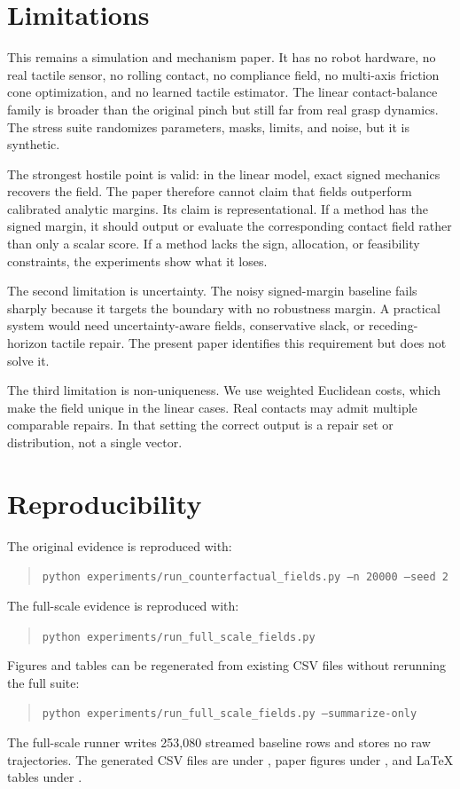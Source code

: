 \documentclass{article}
\begin{document}
\section{Limitations}

This remains a simulation and mechanism paper. It has no robot hardware, no real tactile sensor, no rolling contact, no compliance field, no multi-axis friction cone optimization, and no learned tactile estimator. The linear contact-balance family is broader than the original pinch but still far from real grasp dynamics. The stress suite randomizes parameters, masks, limits, and noise, but it is synthetic.

The strongest hostile point is valid: in the linear model, exact signed mechanics recovers the field. The paper therefore cannot claim that fields outperform calibrated analytic margins. Its claim is representational. If a method has the signed margin, it should output or evaluate the corresponding contact field rather than only a scalar score. If a method lacks the sign, allocation, or feasibility constraints, the experiments show what it loses.

The second limitation is uncertainty. The noisy signed-margin baseline fails sharply because it targets the boundary with no robustness margin. A practical system would need uncertainty-aware fields, conservative slack, or receding-horizon tactile repair. The present paper identifies this requirement but does not solve it.

The third limitation is non-uniqueness. We use weighted Euclidean costs, which make the field unique in the linear cases. Real contacts may admit multiple comparable repairs. In that setting the correct output is a repair set or distribution, not a single vector.

\section{Reproducibility}

The original evidence is reproduced with:
\begin{quote}
\texttt{python experiments/run\_counterfactual\_fields.py --n 20000 --seed 2}
\end{quote}
The full-scale evidence is reproduced with:
\begin{quote}
\texttt{python experiments/run\_full\_scale\_fields.py}
\end{quote}
Figures and tables can be regenerated from existing CSV files without rerunning the full suite:
\begin{quote}
\texttt{python experiments/run\_full\_scale\_fields.py --summarize-only}
\end{quote}
The full-scale runner writes 253,080 streamed baseline rows and stores no raw trajectories. The generated CSV files are under , paper figures under , and LaTeX tables under .
\end{document}
